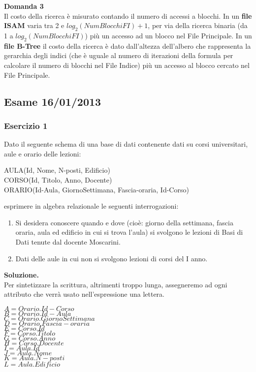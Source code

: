   \noindent\textbf{\fontsize{14pt}{1em}Domanda 3}\\
  Il costo della ricerca è misurato contando il numero di accessi a blocchi. In un \textbf{file ISAM} varia tra 2 e 
  $log_2(NumBlocchiFI) + 1$, per via della ricerca binaria (da 1 a $log_2(NumBlocchiFI)$) più un accesso ad un blocco
  nel File Principale. In un \textbf{file B-Tree} il costo della ricerca è dato dall'altezza dell'albero che rappresenta
  la gerarchia degli indici (che è uguale al numero di iterazioni della formula per calcolare il 
  numero di blocchi nel File Indice) più un accesso al blocco cercato nel File Principale.
  \newpage
  \subsection{Esame 16/01/2013}
  \subsubsection{Esercizio 1}
  Dato il seguente schema di una base di dati contenente dati su corsi universitari, aule e orario delle lezioni:
  \begin{center}
  AULA(Id, Nome, N-posti, Edificio)\\
  CORSO(Id, Titolo, Anno, Docente) \\
  ORARIO(Id-Aula, GiornoSettimana, Fascia-oraria, Id-Corso)\\ 
  \end{center}
  esprimere in algebra relazionale le seguenti interrogazioni:
  \begin{enumerate}
   \item Si desidera conoscere quando e dove (cioè: giorno della settimana, fascia oraria, aula ed edificio in cui 
   si trova l'aula) si svolgono le lezioni di Basi di Dati tenute dal docente Moscarini.
   \item Dati delle aule in cui non si svolgono lezioni di corsi del I anno.
  \end{enumerate}
  \noindent\textbf{\fontsize{14pt}{1em}Soluzione.}\\
  Per sintetizzare la scrittura, altrimenti troppo lunga, assegneremo ad ogni attributo che verrà usato
  nell'espressione una lettera.
  
  \begin{multicols}{3}
  \begin{flushleft}
   $A = Orario.Id-Corso$\\
   $B = Orario.Id-Aula$\\
   $C = Orario.GiornoSettimana$\\
   $D = Orario.Fascia-oraria$\\
   $E = Corso.Id$\\
   $F = Corso.Titolo$\\
   $G = Corso.Anno$\\
   $H = Corso.Docente$\\
   $I = Aula.Id$\\
   $J = Aula.Nome$\\
   $K = Aula.N-posti$\\
   $L = Aula.Edificio$\\
  \end{flushleft}
  \end{multicols}

